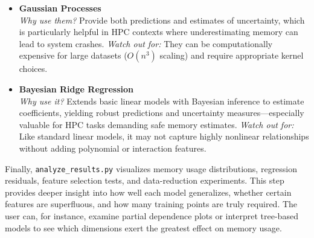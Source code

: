 \begin{itemize}
    \item \textbf{Gaussian Processes}~\cite{rasmussen2006gaussian}\\
    \emph{Why use them?} Provide both predictions and estimates of uncertainty, which is particularly helpful in \ac{HPC} contexts where underestimating memory can lead to system crashes.
    \emph{Watch out for:} They can be computationally expensive for large datasets (\(O(n^3)\) scaling) and require appropriate kernel choices.

    \item \textbf{Bayesian Ridge Regression}~\cite{bishop2006pattern}\\
    \emph{Why use it?} Extends basic linear models with Bayesian inference to estimate coefficients, yielding robust predictions and uncertainty measures—especially valuable for HPC tasks demanding safe memory estimates.
    \emph{Watch out for:} Like standard linear models, it may not capture highly nonlinear relationships without adding polynomial or interaction features.
\end{itemize}

Finally, \texttt{analyze\_results.py} visualizes memory usage distributions, regression residuals, feature selection tests, and data-reduction experiments.
This step provides deeper insight into how well each model generalizes, whether certain features are superfluous, and how many training points are truly required.
The user can, for instance, examine partial dependence plots or interpret tree-based models to see which dimensions exert the greatest effect on memory usage.


